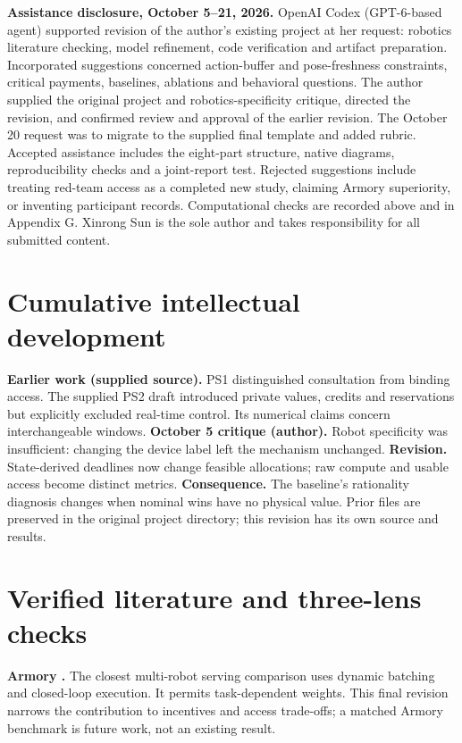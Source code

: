 \textbf{Assistance disclosure, October 5--21, 2026.} OpenAI Codex (GPT-6-based agent) supported revision of the author's existing project at her request: robotics literature checking, model refinement, code verification and artifact preparation. Incorporated suggestions concerned action-buffer and pose-freshness constraints, critical payments, baselines, ablations and behavioral questions. The author supplied the original project and robotics-specificity critique, directed the revision, and confirmed review and approval of the earlier revision. The October 20 request was to migrate to the supplied final template and added rubric. Accepted assistance includes the eight-part structure, native diagrams, reproducibility checks and a joint-report test. Rejected suggestions include treating red-team access as a completed new study, claiming Armory superiority, or inventing participant records. Computational checks are recorded above and in Appendix G. Xinrong Sun is the sole author and takes responsibility for all submitted content.

\section{Cumulative intellectual development}
\textbf{Earlier work (supplied source).} PS1 distinguished consultation from binding access. The supplied PS2 draft introduced private values, credits and reservations but explicitly excluded real-time control. Its numerical claims concern interchangeable windows. \textbf{October 5 critique (author).} Robot specificity was insufficient: changing the device label left the mechanism unchanged. \textbf{Revision.} State-derived deadlines now change feasible allocations; raw compute and usable access become distinct metrics. \textbf{Consequence.} The baseline's rationality diagnosis changes when nominal wins have no physical value. Prior files are preserved in the original project directory; this revision has its own source and results.

\section{Verified literature and three-lens checks}
\textbf{Armory \cite{armory}.} The closest multi-robot serving comparison uses dynamic batching and closed-loop execution. It permits task-dependent weights. This final revision narrows the contribution to incentives and access trade-offs; a matched Armory benchmark is future work, not an existing result.

